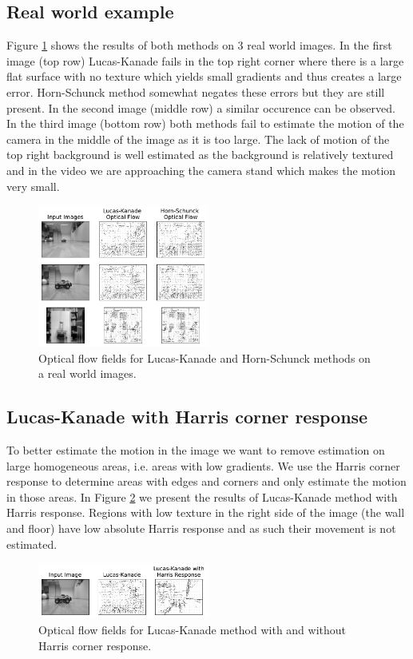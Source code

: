 \documentclass[9pt]{IEEEtran}
\begin{document}
\subsection*{Real world example}

Figure \ref{lk-hs-real} shows the results of both methods on 3 real world images.
In the first image (top row) Lucas-Kanade fails in the top right corner where there is a large flat surface with no texture which yields small gradients and thus creates a large error.
Horn-Schunck method somewhat negates these errors but they are still present.
In the second image (middle row) a similar occurence can be observed.
In the third image (bottom row) both methods fail to estimate the motion of the camera in the middle of the image as it is too large.
The lack of motion of the top right background is well estimated as the background is relatively textured and in the video we are approaching the camera stand which makes the motion very small.
\begin{figure}[H]
    \centering
    \includegraphics[width=0.5\textwidth]{LK_HS_real.pdf}
    \vspace{-15px}
    \caption{Optical flow fields for Lucas-Kanade and Horn-Schunck methods on a real world images.}
    \label{lk-hs-real}
\end{figure}

\subsection*{Lucas-Kanade with Harris corner response}
To better estimate the motion in the image we want to remove estimation on large homogeneous areas, i.e. areas with low gradients.
We use the Harris corner response to determine areas with edges and corners and only estimate the motion in those areas.
In Figure \ref{lk-improvement} we present the results of Lucas-Kanade method with Harris response.
Regions with low texture in the right side of the image (the wall and floor) have low absolute Harris response and as such their movement is not estimated.
\begin{figure}[H]
    \centering
    \includegraphics[width=0.5\textwidth]{LK_Harris.pdf}
    \vspace{-15px}
    \caption{Optical flow fields for Lucas-Kanade method with and without Harris corner response.}
    \label{lk-improvement}
\end{figure}
\end{document}

